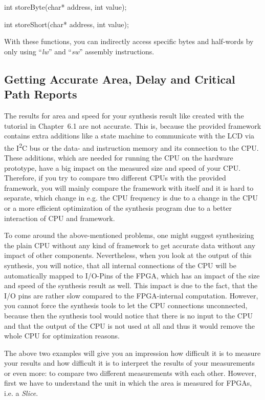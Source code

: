 \documentclass[
]{article}
\begin{document}
int storeByte(char* address, int value);

int storeShort(char* address, int value);

With these functions, you can indirectly access specific bytes and
half-words by only using ``\emph{lw}'' and ``\emph{sw}'' assembly
instructions.

\hypertarget{getting-accurate-area-delay-and-critical-path-reports}{%
\subsection{Getting Accurate Area, Delay and Critical Path
Reports}\label{getting-accurate-area-delay-and-critical-path-reports}}

The results for area and speed for your synthesis result like created
with the tutorial in Chapter~6.1 are not accurate. This is, because the
provided framework contains extra additions like a state machine to
communicate with the LCD via the I\textsuperscript{2}C bus or the data-
and instruction memory and its connection to the CPU. These additions,
which are needed for running the CPU on the hardware prototype, have a
big impact on the measured size and speed of your CPU. Therefore, if you
try to compare two different CPUs with the provided framework, you will
mainly compare the framework with itself and it is hard to separate,
which change in e.g. the CPU frequency is due to a change in the CPU or
a more efficient optimization of the synthesis program due to a better
interaction of CPU and framework.

To come around the above-mentioned problems, one might suggest
synthesizing the plain CPU without any kind of framework to get accurate
data without any impact of other components. Nevertheless, when you look
at the output of this synthesis, you will notice, that all internal
connections of the CPU will be automatically mapped to I/O-Pins of the
FPGA, which has an impact of the size and speed of the synthesis result
as well. This impact is due to the fact, that the I/O pins are rather
slow compared to the FPGA-internal computation. However, you cannot
force the synthesis tools to let the CPU connections unconnected,
because then the synthesis tool would notice that there is no input to
the CPU and that the output of the CPU is not used at all and thus it
would remove the whole CPU for optimization reasons.

The above two examples will give you an impression how difficult it is
to measure your results and how difficult it is to interpret the results
of your measurements or even more: to compare two different measurements
with each other. However, first we have to understand the unit in which
the area is measured for FPGAs, i.e. a \emph{Slice}.
\end{document}
